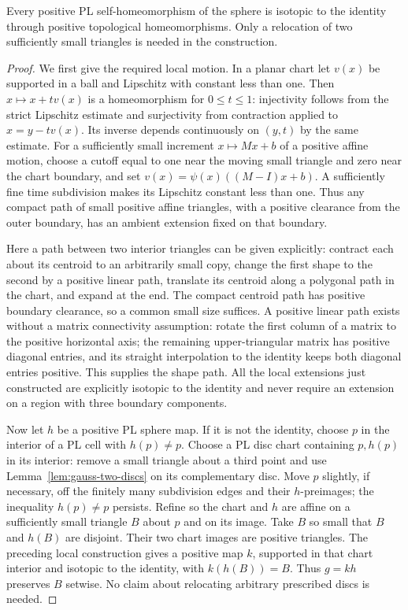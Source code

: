 \begin{lemma}
\label{lem:gauss-sphere-isotopy}
Every positive PL self-homeomorphism of the sphere is isotopic to the
identity through positive topological homeomorphisms. Only a relocation
of two sufficiently small triangles is needed in the construction.
\end{lemma}
\begin{proof}
We first give the required local motion. In a planar chart let $v(x)$
be supported in a ball and Lipschitz with constant less than one.
Then $x\mapsto x+t v(x)$ is a homeomorphism for $0\leq t\leq1$:
injectivity follows from the strict Lipschitz estimate and surjectivity
from contraction applied to $x=y-tv(x)$. Its inverse depends
continuously on $(y,t)$ by the same estimate. For a sufficiently small
increment $x\mapsto Mx+b$ of a positive affine motion, choose a cutoff
equal to one near the moving small triangle and zero near the chart
boundary, and set $v(x)=\psi(x)((M-I)x+b)$. A sufficiently fine time
subdivision makes its Lipschitz constant less than one. Thus any compact
path of small positive affine triangles, with a positive clearance from
the outer boundary, has an ambient extension fixed on that boundary.

Here a path between two interior triangles can be given explicitly:
contract each about its centroid to an arbitrarily small copy, change
the first shape to the second by a positive linear path, translate its
centroid along a polygonal path in the chart, and expand at the end.
The compact centroid path has positive boundary clearance, so a common
small size suffices. A positive linear path exists without a matrix
connectivity assumption: rotate the first column of a matrix to the
positive horizontal axis; the remaining upper-triangular matrix has
positive diagonal entries, and its straight interpolation to the
identity keeps both diagonal entries positive. This supplies the
shape path. All the local extensions just constructed are explicitly
isotopic to the identity and never require an extension on a region
with three boundary components.

Now let $h$ be a positive PL sphere map. If it is not the identity,
choose $p$ in the interior of a PL cell with $h(p)\ne p$.
Choose a PL disc chart containing $p,h(p)$ in its interior: remove a
small triangle about a third point and use Lemma~\ref{lem:gauss-two-discs}
on its complementary disc. Move $p$ slightly, if necessary, off the
finitely many subdivision edges and their $h$-preimages; the inequality
$h(p)\ne p$ persists. Refine so the chart and $h$ are affine
on a sufficiently small triangle $B$ about $p$ and on its image.
Take $B$ so small that $B$ and $h(B)$ are disjoint. Their two chart
images are positive triangles. The preceding local construction gives
a positive map $k$, supported in that chart interior and isotopic to
the identity, with $k(h(B))=B$. Thus $g=kh$ preserves $B$ setwise.
No claim about relocating arbitrary prescribed discs is needed.


\end{proof}
